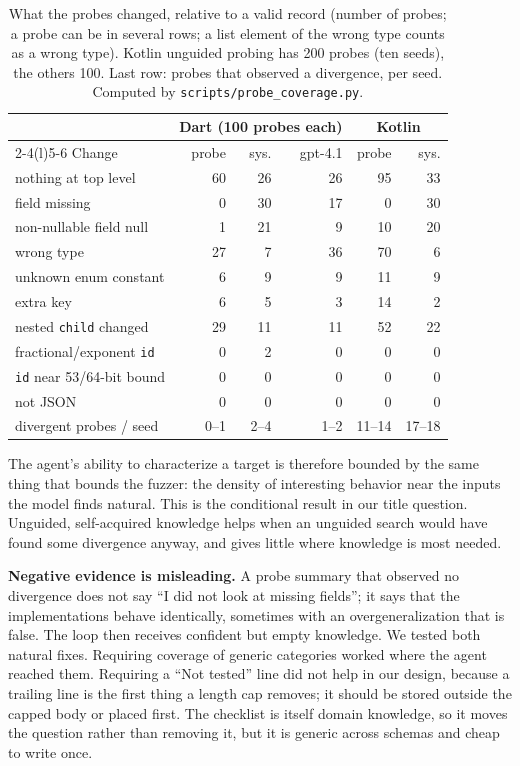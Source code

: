 \begin{table}[t]
\centering
\caption{What the probes changed, relative to a valid record (number of
probes; a probe can be in several rows; a list element of the wrong type
counts as a wrong type). Kotlin unguided probing has 200 probes (ten seeds),
the others 100. Last row: probes that observed a divergence, per seed.
Computed by \texttt{scripts/probe\_coverage.py}.}
\label{tab:coverage}
\footnotesize
\setlength{\tabcolsep}{3pt}
\begin{tabular}{@{}lrrrrr@{}}
\toprule
& \multicolumn{3}{c}{Dart (100 probes each)} & \multicolumn{2}{c}{Kotlin} \\
\cmidrule(lr){2-4}\cmidrule(l){5-6}
Change & probe & sys. & gpt-4.1 & probe & sys. \\
\midrule
nothing at top level     & 60 & 26 & 26 & 95  & 33 \\
field missing            & 0  & 30 & 17 & 0   & 30 \\
non-nullable field null  & 1  & 21 & 9  & 10  & 20 \\
wrong type               & 27 & 7  & 36 & 70  & 6 \\
unknown enum constant    & 6  & 9  & 9  & 11  & 9 \\
extra key                & 6  & 5  & 3  & 14  & 2 \\
nested \texttt{child} changed & 29 & 11 & 11 & 52 & 22 \\
fractional/exponent \texttt{id} & 0 & 2 & 0 & 0 & 0 \\
\texttt{id} near 53/64-bit bound & 0 & 0 & 0 & 0 & 0 \\
not JSON                 & 0  & 0  & 0  & 0   & 0 \\
\midrule
divergent probes / seed  & 0--1 & 2--4 & 1--2 & 11--14 & 17--18 \\
\bottomrule
\end{tabular}
\end{table}
The agent's ability to characterize a target is therefore bounded by the
same thing that bounds the fuzzer: the density of interesting behavior near
the inputs the model finds natural. This is the conditional result in our
title question. Unguided, self-acquired knowledge helps when an unguided
search would have found some divergence anyway, and gives little where
knowledge is most needed.

\textbf{Negative evidence is misleading.} A probe summary that observed no
divergence does not say ``I did not look at missing fields''; it says that
the implementations behave identically, sometimes with an overgeneralization
that is false. The loop then receives confident but empty knowledge. We tested
both natural fixes. Requiring coverage of generic categories worked where the
agent reached them. Requiring a ``Not tested'' line did not help in our
design, because a trailing line is the first thing a length cap removes; it
should be stored outside the capped body or placed first. The checklist is
itself domain knowledge, so it moves the question rather than removing it,
but it is generic across schemas and cheap to write once.

